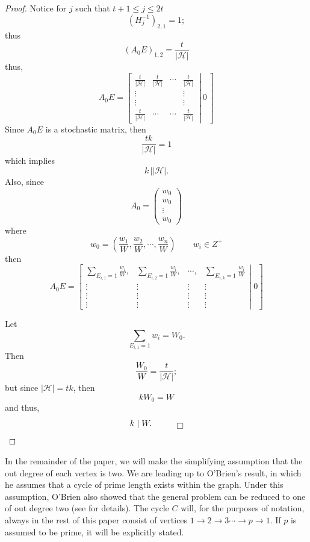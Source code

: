 \begin{proof}
Notice for $j$ such that $t+1\le j\le 2t$
\[
  \left( H_j^{-1}\right) _{2,1}=1;
\]
thus
\[
  \left( A_0E\right) _{1,2}=\frac t{|\mathcal{H}|}
\]
thus,
\[
  A_0E=\left[ \left.\begin{matrix} 
	\frac t{|\mathcal{H}|} & \frac t{|\mathcal{H}|} 
		&\cdots & \frac t{|\mathcal{H}|} \\
	\vdots & {} & {} & \vdots \\
	\vdots & {} & {} & \vdots \\
	\frac t{|\mathcal{H}|} & \cdots & \cdots & \frac t{|\mathcal{H}|}  
	\end{matrix}\,\right|\ 0\ \right] 
\]
Since $A_0E$ is a stochastic matrix, then
\[
  \frac{tk}{|\mathcal{H}|}=1
\]
which implies
\[
  k\,\bigg|\left|\mathcal{H}\right|.
\]
Also, since
\[
  A_0=\begin{pmatrix} w_0 \\ w_0 \\ \vdots \\ w_0\end{pmatrix}
\]
where
\[
  w_0=\left( \frac{w_1}W,\frac{w_2}W,\cdots,\frac{w_n}W\right) \qquad w_i\in Z^+
\]
then
\[
  A_0E=\left[ \left.\begin{matrix}
	\sum\limits_{E_{i,1}=1}\frac{w_i}W, 
		& \sum\limits_{E_{i,2}=1}\frac{w_i}W, 
		&\cdots, 
		& \sum\limits_{E_{i,k}=1}\frac{w_i}W \\
	\vdots & \vdots & \vdots & \vdots \\
	\vdots & \vdots & \vdots & \vdots \\
	\vdots & \vdots & \vdots & \vdots
	\end{matrix} \right|\,\, 0\right]  
\]

Let
\[
  \sum_{E_{i,1}=1}w_i=W_0.
\]
Then
\[
  \frac{W_0}W=\frac t{|\mathcal{H}|};
\]
but since $|\mathcal{H}|=tk$, then
\[
  kW_0=W
\]
and thus,
\[
  k\mid W. \quad \qed
\]
\end{proof}

In the remainder of the paper, we will make the simplifying assumption that
the out degree of each vertex is two. 
We are leading up to O'Brien's result, in which he assumes that a cycle of prime length exists within the graph. 
Under this assumption, O'Brien also showed that the general problem can be reduced to one of out degree two (see \cite{O} for details).
The cycle $C$ will, for the purposes of notation, always in the rest of this
paper consist of vertices $1\to 2\to 3\cdots\to p\to 1$. 
If $p$ is assumed to be prime, it will be explicitly stated.

